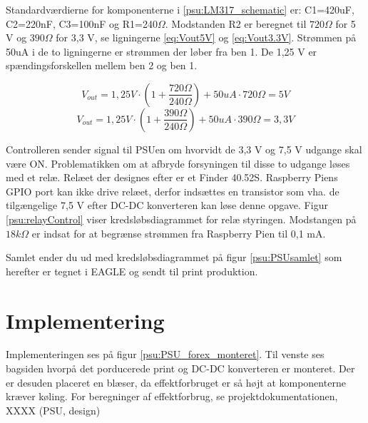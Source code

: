 
Standardværdierne for komponenterne i \ref{psu:LM317_schematic} er: C1=420uF, C2=220nF, C3=100nF og R1=240$\Omega$. Modstanden R2 er beregnet til $720\Omega$ for 5 V og $390\Omega$ for 3,3 V, se ligningerne \ref{eq:Vout5V} og \ref{eq:Vout3.3V}. Strømmen på 50uA i de to ligningerne er strømmen der løber fra ben 1. De 1,25 V er spændingsforskellen mellem ben 2 og ben 1. 

\begin{equation} 
{ V }_{ out }=1,25V\cdot \left( 1+\frac { 720\Omega  }{ 240\Omega  }  \right) +50uA\cdot 720\Omega =5V
\label{eq:Vout5V}
\end{equation}
\begin{equation} 
{ V }_{ out }=1,25V\cdot \left( 1+\frac { 390\Omega  }{ 240\Omega  }  \right) +50uA\cdot 390\Omega =3,3V
\label{eq:Vout3.3V}
\end{equation}

Controlleren sender signal til PSUen om hvorvidt de 3,3 V og 7,5 V udgange skal være ON. Problematikken om at afbryde forsyningen til disse to udgange løses med et relæ. Relæet der designes efter er et Finder 40.52S. Raspberry Piens GPIO port kan ikke drive relæet, derfor indsættes en transistor som vha. de tilgængelige 7,5 V efter DC-DC konverteren kan løse denne opgave. Figur \ref{psu:relayControl} viser kredsløbsdiagrammet for relæ styringen. Modstangen på $18k\Omega$ er indsat for at begrænse strømmen fra Raspberry Pien til 0,1 mA. 


Samlet ender du ud med kredsløbsdiagrammet på figur \ref{psu:PSUsamlet} som herefter er tegnet i EAGLE og sendt til print produktion. 

\section{Implementering}

Implementeringen ses på figur \ref{psu:PSU_forex_monteret}. Til venste ses bagsiden hvorpå det porducerede print og DC-DC konverteren er monteret. Der er desuden placeret en blæser, da effektforbruget er så højt at komponenterne kræver køling. For beregninger af effektforbrug, se projektdokumentationen, XXXX (PSU, design)


